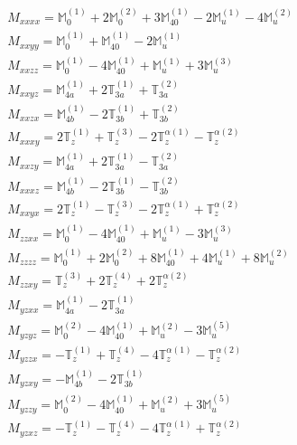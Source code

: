 \documentclass[fleqn,8pt,landscape]{jsarticle}
\begin{document}
\begin{align*}
& M_{xxxx} = \mathbb{M}_{0}^{(1)} + 2 \mathbb{M}_{0}^{(2)} + 3 \mathbb{M}_{40}^{(1)} - 2 \mathbb{M}_{u}^{(1)} - 4 \mathbb{M}_{u}^{(2)} \\
& M_{xxyy} = \mathbb{M}_{0}^{(1)} + \mathbb{M}_{40}^{(1)} - 2 \mathbb{M}_{u}^{(1)} \\
& M_{xxzz} = \mathbb{M}_{0}^{(1)} - 4 \mathbb{M}_{40}^{(1)} + \mathbb{M}_{u}^{(1)} + 3 \mathbb{M}_{u}^{(3)} \\
& M_{xxyz} = \mathbb{M}_{4a}^{(1)} + 2 \mathbb{T}_{3a}^{(1)} + \mathbb{T}_{3a}^{(2)} \\
& M_{xxzx} = \mathbb{M}_{4b}^{(1)} - 2 \mathbb{T}_{3b}^{(1)} + \mathbb{T}_{3b}^{(2)} \\
& M_{xxxy} = 2 \mathbb{T}_{z}^{(1)} + \mathbb{T}_{z}^{(3)} - 2 \mathbb{T}_{z}^{\alpha(1)} - \mathbb{T}_{z}^{\alpha(2)} \\
& M_{xxzy} = \mathbb{M}_{4a}^{(1)} + 2 \mathbb{T}_{3a}^{(1)} - \mathbb{T}_{3a}^{(2)} \\
& M_{xxxz} = \mathbb{M}_{4b}^{(1)} - 2 \mathbb{T}_{3b}^{(1)} - \mathbb{T}_{3b}^{(2)} \\
& M_{xxyx} = 2 \mathbb{T}_{z}^{(1)} - \mathbb{T}_{z}^{(3)} - 2 \mathbb{T}_{z}^{\alpha(1)} + \mathbb{T}_{z}^{\alpha(2)} \\
& M_{zzxx} = \mathbb{M}_{0}^{(1)} - 4 \mathbb{M}_{40}^{(1)} + \mathbb{M}_{u}^{(1)} - 3 \mathbb{M}_{u}^{(3)} \\
& M_{zzzz} = \mathbb{M}_{0}^{(1)} + 2 \mathbb{M}_{0}^{(2)} + 8 \mathbb{M}_{40}^{(1)} + 4 \mathbb{M}_{u}^{(1)} + 8 \mathbb{M}_{u}^{(2)} \\
& M_{zzxy} = \mathbb{T}_{z}^{(3)} + 2 \mathbb{T}_{z}^{(4)} + 2 \mathbb{T}_{z}^{\alpha(2)} \\
& M_{yzxx} = \mathbb{M}_{4a}^{(1)} - 2 \mathbb{T}_{3a}^{(1)} \\
& M_{yzyz} = \mathbb{M}_{0}^{(2)} - 4 \mathbb{M}_{40}^{(1)} + \mathbb{M}_{u}^{(2)} - 3 \mathbb{M}_{u}^{(5)} \\
& M_{yzzx} = - \mathbb{T}_{z}^{(1)} + \mathbb{T}_{z}^{(4)} - 4 \mathbb{T}_{z}^{\alpha(1)} - \mathbb{T}_{z}^{\alpha(2)} \\
& M_{yzxy} = - \mathbb{M}_{4b}^{(1)} - 2 \mathbb{T}_{3b}^{(1)} \\
& M_{yzzy} = \mathbb{M}_{0}^{(2)} - 4 \mathbb{M}_{40}^{(1)} + \mathbb{M}_{u}^{(2)} + 3 \mathbb{M}_{u}^{(5)} \\
& M_{yzxz} = - \mathbb{T}_{z}^{(1)} - \mathbb{T}_{z}^{(4)} - 4 \mathbb{T}_{z}^{\alpha(1)} + \mathbb{T}_{z}^{\alpha(2)}
\end{align*}
\end{document}
